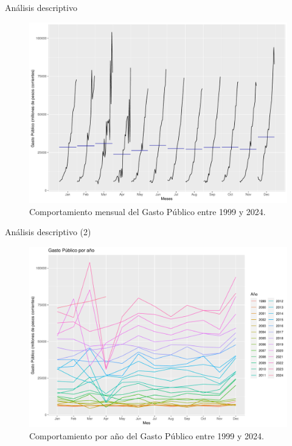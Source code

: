 \documentclass[
  ignorenonframetext,
]{beamer}
\begin{document}
\begin{frame}{Análisis descriptivo}
\protect\hypertarget{anuxe1lisis-descriptivo}{}
\begin{figure}[H]

{\centering \includegraphics[width=0.85\linewidth]{presentacion_files/figure-beamer/month_plot-1} 

}

\caption{\label{month_plot} Comportamiento mensual del Gasto Público entre 1999 y 2024.}\label{fig:month_plot}
\end{figure}
\end{frame}

\begin{frame}{Análisis descriptivo (2)}
\protect\hypertarget{anuxe1lisis-descriptivo-2}{}
\begin{figure}[H]

{\centering \includegraphics[width=0.85\linewidth]{presentacion_files/figure-beamer/season_plot-1} 

}

\caption{\label{seasonal_plot} Comportamiento por año del Gasto Público entre 1999 y 2024.}\label{fig:season_plot}
\end{figure}
\end{frame}
\end{document}
